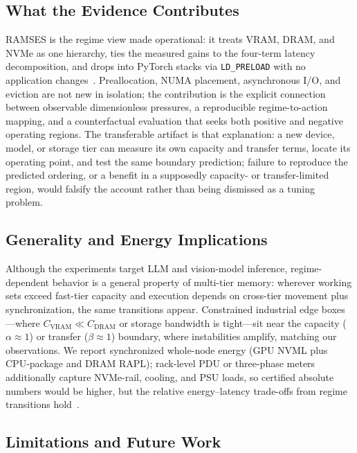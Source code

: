 \subsection{What the Evidence Contributes}
RAMSES is the regime view made operational: it treats VRAM, DRAM, and NVMe as one hierarchy, ties the measured gains to the four-term latency decomposition, and drops into PyTorch stacks via \texttt{LD\_PRELOAD} with no application changes~\cite{swapAdvisor2020,kwon2023pagedattention}. Preallocation, NUMA placement, asynchronous I/O, and eviction are not new in isolation; the contribution is the explicit connection between observable dimensionless pressures, a reproducible regime-to-action mapping, and a counterfactual evaluation that seeks both positive and negative operating regions. The transferable artifact is that explanation: a new device, model, or storage tier can measure its own capacity and transfer terms, locate its operating point, and test the same boundary prediction; failure to reproduce the predicted ordering, or a benefit in a supposedly capacity- or transfer-limited region, would falsify the account rather than being dismissed as a tuning problem.

\subsection{Generality and Energy Implications}
Although the experiments target LLM and vision-model inference, regime-dependent behavior is a general property of multi-tier memory: wherever working sets exceed fast-tier capacity and execution depends on cross-tier movement plus synchronization, the same transitions appear. Constrained industrial edge boxes---where $C_{\mathrm{VRAM}}\ll C_{\mathrm{DRAM}}$ or storage bandwidth is tight---sit near the capacity ($\alpha\approx1$) or transfer ($\beta\approx1$) boundary, where instabilities amplify, matching our observations. We report synchronized whole-node energy (GPU NVML plus CPU-package and DRAM RAPL); rack-level PDU or three-phase meters additionally capture NVMe-rail, cooling, and PSU loads, so certified absolute numbers would be higher, but the relative energy--latency trade-offs from regime transitions hold~\cite{huang2019gpipe,stojkovic2025dynamollm}.

\subsection{Limitations and Future Work}
\label{sec:future_work}

